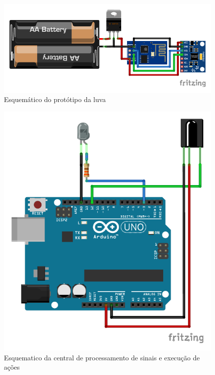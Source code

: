 \begin{figure}
    \centering
    \includegraphics{resources/esquematico_tcc_bb.pdf}
    \caption{Esquemático do protótipo da luva}
    \label{fig:my_label}
\end{figure}

\begin{figure}
    \centering
    \includegraphics{resources/esquematico_central_bb.pdf}
    \caption{Esquematico da central de processamento de sinais e execução de ações}
    \label{fig:esq_central}
\end{figure}

